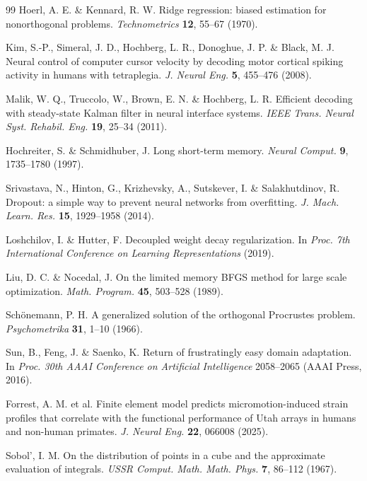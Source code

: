 \begin{thebibliography}{99}
 Hoerl, A. E. \& Kennard, R. W. Ridge regression: biased estimation for nonorthogonal problems. \textit{Technometrics} \textbf{12}, 55--67 (1970).

 Kim, S.-P., Simeral, J. D., Hochberg, L. R., Donoghue, J. P. \& Black, M. J. Neural control of computer cursor velocity by decoding motor cortical spiking activity in humans with tetraplegia. \textit{J. Neural Eng.} \textbf{5}, 455--476 (2008).

 Malik, W. Q., Truccolo, W., Brown, E. N. \& Hochberg, L. R. Efficient decoding with steady-state Kalman filter in neural interface systems. \textit{IEEE Trans. Neural Syst. Rehabil. Eng.} \textbf{19}, 25--34 (2011).

 Hochreiter, S. \& Schmidhuber, J. Long short-term memory. \textit{Neural Comput.} \textbf{9}, 1735--1780 (1997).

 Srivastava, N., Hinton, G., Krizhevsky, A., Sutskever, I. \& Salakhutdinov, R. Dropout: a simple way to prevent neural networks from overfitting. \textit{J. Mach. Learn. Res.} \textbf{15}, 1929--1958 (2014).

 Loshchilov, I. \& Hutter, F. Decoupled weight decay regularization. In \textit{Proc. 7th International Conference on Learning Representations} (2019).

 Liu, D. C. \& Nocedal, J. On the limited memory BFGS method for large scale optimization. \textit{Math. Program.} \textbf{45}, 503--528 (1989).

 Sch{\"o}nemann, P. H. A generalized solution of the orthogonal Procrustes problem. \textit{Psychometrika} \textbf{31}, 1--10 (1966).

 Sun, B., Feng, J. \& Saenko, K. Return of frustratingly easy domain adaptation. In \textit{Proc. 30th AAAI Conference on Artificial Intelligence} 2058--2065 (AAAI Press, 2016).

 Forrest, A. M. et al. Finite element model predicts micromotion-induced strain profiles that correlate with the functional performance of Utah arrays in humans and non-human primates. \textit{J. Neural Eng.} \textbf{22}, 066008 (2025).

 Sobol', I. M. On the distribution of points in a cube and the approximate evaluation of integrals. \textit{USSR Comput. Math. Math. Phys.} \textbf{7}, 86--112 (1967).


\end{thebibliography}
